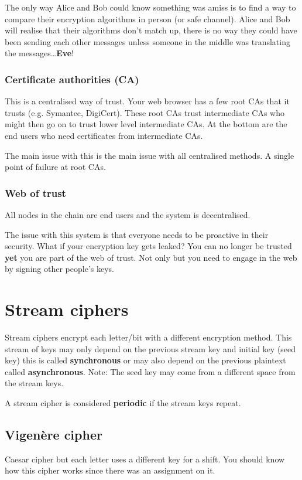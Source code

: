 \documentclass{report}
\begin{document}
The only way Alice and Bob could know something was amiss is to find a way
to compare their encryption algorithms in person (or safe channel). Alice
and Bob will realise that their algorithms don't match up, there is no way
they could have been sending each other messages unless someone in the middle
was translating the messages\ldots \textbf{Eve}!

\subsection{Certificate authorities (CA)}
This is a centralised way of trust. Your web browser has a few root CAs that
it trusts (e.g. Symantec, DigiCert). These root CAs trust intermediate CAs
who might then go on to trust lower level intermediate CAs. At the bottom
are the end users who need certificates from intermediate CAs.

The main issue with this is the main issue with all centralised methods.
A single point of failure at root CAs.

\subsection{Web of trust}
All nodes in the chain are end users and the system is decentralised.

The issue with this system is that everyone needs to be proactive in their
security. What if your encryption key gets leaked? You can no longer be trusted
\textbf{yet} you are part of the web of trust. Not only but you need to
engage in the web by signing other people's keys.

\chapter{Stream ciphers}
Stream ciphers encrypt each letter/bit with a different encryption method.
This stream of keys may only depend on the previous stream key and initial key
(seed key) this is called \textbf{synchronous}
or may also depend on the previous plaintext called \textbf{asynchronous}.
Note: The seed key may come from a different space from the stream keys.

A stream cipher is considered \textbf{periodic} if the stream keys repeat.

\section{Vigenère cipher}
Caesar cipher but each letter uses a different key for a shift. You should
know how this cipher works since there was an assignment on it.
\end{document}
